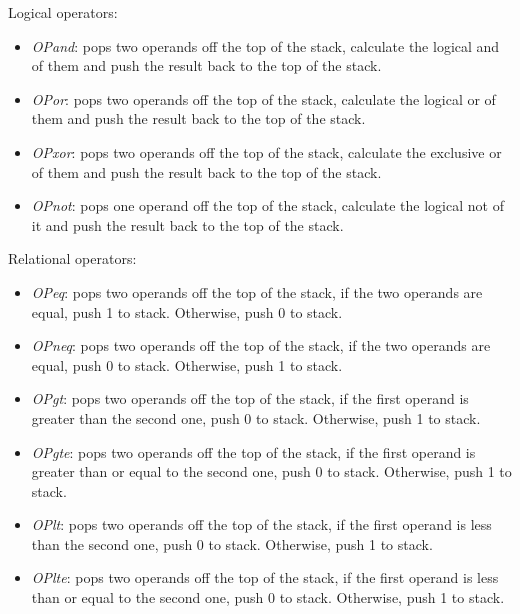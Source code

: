 Logical operators:
\begin{itemize}
\item \emph{OPand}: pops two operands off the top of the stack, calculate the logical and of them and push the result back to the top of the stack.
\item \emph{OPor}: pops two operands off the top of the stack, calculate the logical or of them and push the result back to the top of the stack.
\item \emph{OPxor}: pops two operands off the top of the stack, calculate the exclusive or of them and push the result back to the top of the stack.
\item \emph{OPnot}: pops one operand off the top of the stack, calculate the logical not of it and push the result back to the top of the stack.
\end{itemize}

Relational operators:
\begin{itemize}
\item \emph{OPeq}: pops two operands off the top of the stack, if the two operands are equal, push 1 to stack. Otherwise, push 0 to stack.
\item \emph{OPneq}: pops two operands off the top of the stack, if the two operands are equal, push 0 to stack. Otherwise, push 1 to stack.
\item \emph{OPgt}: pops two operands off the top of the stack, if the first operand is greater than the second one, push 0 to stack. Otherwise, push 1 to stack.
\item \emph{OPgte}: pops two operands off the top of the stack, if the first operand is greater than or equal to the second one, push 0 to stack. Otherwise, push 1 to stack.
\item \emph{OPlt}: pops two operands off the top of the stack, if the first operand is less than the second one, push 0 to stack. Otherwise, push 1 to stack.
\item \emph{OPlte}: pops two operands off the top of the stack, if the first operand is less than or equal to the second one, push 0 to stack. Otherwise, push 1 to stack.
\end{itemize}

